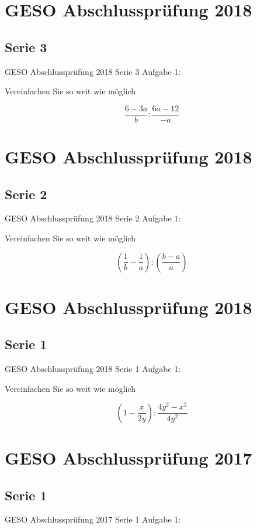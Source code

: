 \section*{GESO Abschlussprüfung 2018}
\subsection*{Serie 3}
GESO Abschlussprüfung 2018 Serie 3 Aufgabe 1:

Vereinfachen Sie so weit wie möglich

$$\frac{6-3a}{b} : \frac{6a-12}{-a}$$




\section*{GESO Abschlussprüfung 2018}
\subsection*{Serie 2}
GESO Abschlussprüfung 2018 Serie 2 Aufgabe 1:

Vereinfachen Sie so weit wie möglich

$$\left(\frac1b - \frac1a \right) : \left( \frac{b-a}{a}  \right)$$




\section*{GESO Abschlussprüfung 2018}
\subsection*{Serie 1}
GESO Abschlussprüfung 2018 Serie 1 Aufgabe 1:

Vereinfachen Sie so weit wie möglich

$$\left(1 - \frac{x}{2y} \right) : \frac{4y^2-x^2}{4y^2}$$



\section*{GESO Abschlussprüfung 2017}
\subsection*{Serie 1}
GESO Abschlussprüfung 2017 Serie 1 Aufgabe 1:

